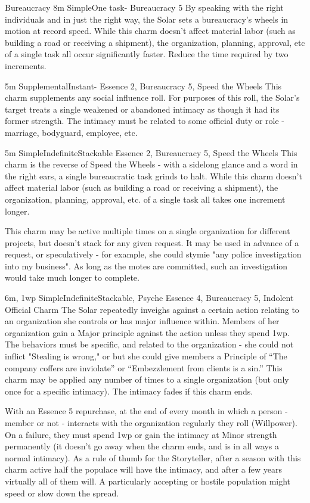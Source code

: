 \begin{Ability}{Bureaucracy}
  {8m}
  {Simple}{One task}{-}
  {Bureaucracy 5}
  By speaking with the right individuals and in just the right way, the Solar sets a bureaucracy's wheels in motion at record speed. While this charm doesn't affect material labor (such as building a road or receiving a shipment), the organization, planning, approval, etc of a single task all occur significantly faster. Reduce the time required by two increments.

  {5m}
  {Supplemental}{Instant}{-}
  {Essence 2, Bureaucracy 5, Speed the Wheels}
  This charm supplements any social influence roll. For purposes of this roll, the Solar's target treats a single weakened or abandoned intimacy as though it had its former strength. The intimacy must be related to some official duty or role - marriage, bodyguard, employee, etc.

  {5m}
  {Simple}{Indefinite}{Stackable}
  {Essence 2, Bureaucracy 5, Speed the Wheels}
  This charm is the reverse of Speed the Wheels - with a sidelong glance and a word in the right ears, a single bureaucratic task grinds to halt. While this charm doesn't affect material labor (such as building a road or receiving a shipment), the organization, planning, approval, etc. of a single task all takes one increment longer.

  This charm may be active multiple times on a single organization for different projects, but doesn't stack for any given request. It may be used in advance of a request, or speculatively - for example, she could stymie "any police investigation into my business". As long as the motes are committed, such an investigation would take much longer to complete.

  {6m, 1wp}
  {Simple}{Indefinite}{Stackable, Psyche}
  {Essence 4, Bureaucracy 5, Indolent Official Charm}
  The Solar repeatedly inveighs against a certain action relating to an organization she controls or has major influence within. Members of her organization gain a Major principle against the action unless they spend 1wp. The behaviors must be specific, and related to the organization - she could not inflict "Stealing is wrong," or but she could give members a Principle of “The company coffers are inviolate” or “Embezzlement from clients is a sin.” This charm may be applied any number of times to a single organization (but only once for a specific intimacy). The intimacy fades if this charm ends.

  With an Essence 5 repurchase, at the end of every month in which a person - member or not - interacts with the organization regularly they roll (Willpower). On a failure, they must spend 1wp or gain the intimacy at Minor strength permanently (it doesn't go away when the charm ends, and is in all ways a normal intimacy). As a rule of thumb for the Storyteller, after a season with this charm active half the populace will have the intimacy, and after a few years virtually all of them will. A particularly accepting or hostile population might speed or slow down the spread.

\end{Ability}
